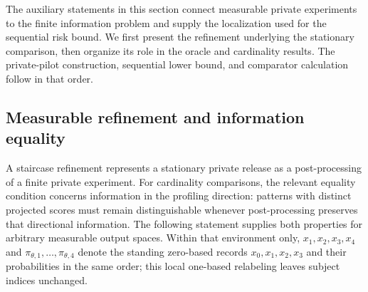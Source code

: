 \documentclass[11pt]{article}
\begin{document}
The auxiliary statements in this section connect measurable private experiments to the finite information problem and supply the localization used for the sequential risk bound. We first present the refinement underlying the stationary comparison, then organize its role in the oracle and cardinality results. The private-pilot construction, sequential lower bound, and comparator calculation follow in that order.

\subsection{Measurable refinement and information equality}

A staircase refinement represents a stationary private release as a post-processing of a finite private experiment. For cardinality comparisons, the relevant equality condition concerns information in the profiling direction: patterns with distinct projected scores must remain distinguishable whenever post-processing preserves that directional information. The following statement supplies both properties for arbitrary measurable output spaces. Within that environment only, \(x_1,x_2,x_3,x_4\) and \(\pi_{\theta,1},\ldots,\pi_{\theta,4}\) denote the standing zero-based records \(x_0,x_1,x_2,x_3\) and their probabilities in the same order; this local one-based relabeling leaves subject indices unchanged.
\end{document}
